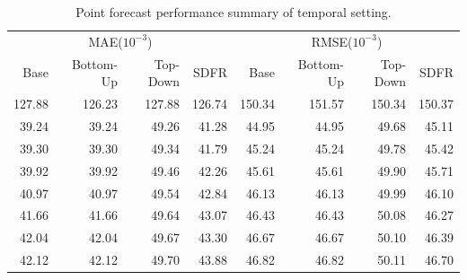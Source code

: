 \documentclass[a4paper,review,12pt,authoryear]{elsarticle}
\begin{document}
\begin{table}[h]
\centering
\caption{\label{tab:sim_temporal_res_point} Point forecast performance summary of temporal setting.}
\begin{tabular}{rrrrrrrr}
\toprule
\multicolumn{4}{c}{MAE($10^{-3}$)}  & 
\multicolumn{4}{c}{RMSE($10^{-3}$)}\\ 
Base & Bottom-Up & Top-Down & SDFR & 
Base & Bottom-Up & Top-Down & SDFR \\
\cmidrule(lr){1-4} \cmidrule(lr){5-8}
127.88 & 126.23 & 127.88 & 126.74 & 150.34 & 151.57 & 150.34 & 150.37\\
 39.24 &  39.24 &  49.26 &  41.28 & 44.95 & 44.95 & 49.68 & 45.11\\
 39.30 &  39.30 &  49.34 &  41.79 & 45.24 & 45.24 & 49.78 & 45.42\\
 39.92 &  39.92 &  49.46 &  42.26 & 45.61 & 45.61 & 49.90 & 45.71\\
 40.97 &  40.97 &  49.54 &  42.84 & 46.13 & 46.13 & 49.99 & 46.10\\
 41.66 &  41.66 &  49.64 &  43.07 & 46.43 & 46.43 & 50.08 & 46.27\\
 42.04 &  42.04 &  49.67 &  43.30 & 46.67 & 46.67 & 50.10 & 46.39\\
 42.12 &  42.12 &  49.70 &  43.88 & 46.82 & 46.82 & 50.11 & 46.70\\
\bottomrule
\end{tabular}
\end{table}
\end{document}
